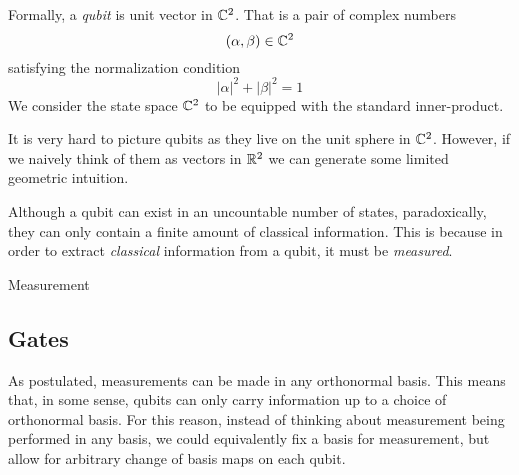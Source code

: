         \begin{definition}
            Formally, a \emph{qubit} is unit vector in $\mathbb{C}^2$. That is a pair of complex numbers
            \[
                (\alpha, \beta) \in \mathbb{C}^2
            \]
            satisfying the normalization condition %
            \[
                |\alpha|^2 + |\beta|^2 = 1
            \]
            We consider the state space $\mathbb{C}^2$ to be equipped with the standard inner-product.
        \end{definition}
        
        
        
        \begin{definition}
               
        \end{definition}

        It is very hard to picture qubits as they live on the unit sphere in $\mathbb{C}^2$. However, if we naively think 
        of them as vectors in $\mathbb{R}^2$ we can generate some limited geometric intuition.  \\
    
        \begin{center}
        \end{center}
        
        



        Although a qubit can exist in an uncountable number of states, paradoxically, they can only contain a 
        finite amount of classical information. This is because in order to extract \emph{classical} information 
        from a qubit, it must be \emph{measured}. 
        

        
        \begin{definition}
            Measurement
        \end{definition}

        



        

    
\subsection{Gates}
        
        As postulated, measurements can be made in any orthonormal basis. This means that, in some sense, qubits 
        can only carry information up to a choice of orthonormal basis. For this reason, instead of thinking about 
        measurement being performed in any basis, we could equivalently fix a basis for measurement, but allow for 
        arbitrary change of basis maps on each qubit. 
        
